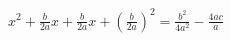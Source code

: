 \documentclass[preview]{standalone}
\begin{document}
\begin{align*}
{x}^{2} + \frac{b}{2 a} x + \frac{b}{2 a} x + {\left( \frac{b}{2 a} \right)}^{2} = \frac{{b}^{2}}{4 {a}^{2}} - \frac{4 a c}{a}
\end{align*}
\end{document}
